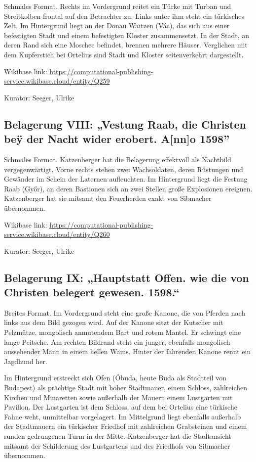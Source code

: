 \documentclass[
  letterpaper,
]{book}
\begin{document}
Schmales Format. Rechts im Vordergrund reitet ein Türke mit Turban und
Streitkolben frontal auf den Betrachter zu. Links unter ihm steht ein
türkisches Zelt. Im Hintergrund liegt an der Donau Waitzen (Vác), das
sich aus einer befestigten Stadt und einem befestigten Kloster
zusammensetzt. In der Stadt, an deren Rand sich eine Moschee befindet,
brennen mehrere Häuser. Verglichen mit dem Kupferstich bei Ortelius sind
Stadt und Kloster seitenverkehrt dargestellt.

Wikibase link:
\url{https://computational-publishing-service.wikibase.cloud/entity/Q259}

Kurator: Seeger, Ulrike

\subsection{Belagerung VIII: „Vestung Raab, die Christen beÿ der Nacht
wider erobert. A{[}nn{]}o
1598''}\label{belagerung-viii-vestung-raab-die-christen-beuxff-der-nacht-wider-erobert.-anno-1598}

Schmales Format. Katzenberger hat die Belagerung effektvoll als
Nachtbild vergegenwärtigt. Vorne rechts stehen zwei Wachsoldaten, deren
Rüstungen und Gewänder im Schein der Laternen aufleuchten. Im
Hintergrund liegt die Festung Raab (Győr), an deren Bastionen sich an
zwei Stellen große Explosionen ereignen. Katzenberger hat sie mitsamt
den Feuerherden exakt von Sibmacher übernommen.

Wikibase link:
\url{https://computational-publishing-service.wikibase.cloud/entity/Q260}

Kurator: Seeger, Ulrike

\subsection{Belagerung IX: „Hauptstatt Offen. wie die von Christen
belegert gewesen.
1598.``}\label{belagerung-ix-hauptstatt-offen.-wie-die-von-christen-belegert-gewesen.-1598.}

Breites Format. Im Vordergrund steht eine große Kanone, die von Pferden
nach links aus dem Bild gezogen wird. Auf der Kanone sitzt der Kutscher
mit Pelzmütze, mongolisch anmutendem Bart und rotem Mantel. Er schwingt
eine lange Peitsche. Am rechten Bildrand steht ein junger, ebenfalls
mongolisch aussehender Mann in einem hellen Wams. Hinter der fahrenden
Kanone rennt ein Jagdhund her.

Im Hintergrund erstreckt sich Ofen (Óbuda, heute Buda als Stadtteil von
Budapest) als prächtige Stadt mit hoher Stadtmauer, einem Schloss,
zahlreichen Kirchen und Minaretten sowie außerhalb der Mauern einem
Lustgarten mit Pavillon. Der Lustgarten ist dem Schloss, auf dem bei
Ortelius eine türkische Fahne weht, unmittelbar vorgelagert. Im
Mittelgrund liegt ebenfalls außerhalb der Stadtmauern ein türkischer
Friedhof mit zahlreichen Grabsteinen und einem runden gedrungenen Turm
in der Mitte. Katzenberger hat die Stadtansicht mitsamt der Schilderung
des Lustgartens und des Friedhofs von Sibmacher übernommen.
\end{document}
